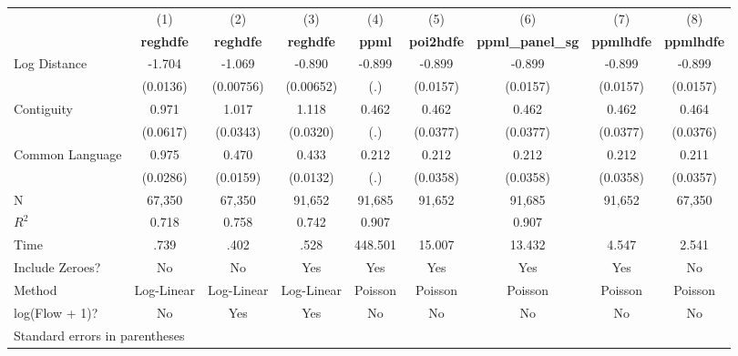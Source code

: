 \begin{tabular}{l*{8}{c}}
\hline\hline
                &\multicolumn{1}{c}{(1)}&\multicolumn{1}{c}{(2)}&\multicolumn{1}{c}{(3)}&\multicolumn{1}{c}{(4)}&\multicolumn{1}{c}{(5)}&\multicolumn{1}{c}{(6)}&\multicolumn{1}{c}{(7)}&\multicolumn{1}{c}{(8)}\\
                &\multicolumn{1}{c}{\textbf{reghdfe}}&\multicolumn{1}{c}{\textbf{reghdfe}}&\multicolumn{1}{c}{\textbf{reghdfe}}&\multicolumn{1}{c}{\textbf{ppml}}&\multicolumn{1}{c}{\textbf{poi2hdfe}}&\multicolumn{1}{c}{\textbf{ppml\_panel\_sg}}&\multicolumn{1}{c}{\textbf{ppmlhdfe}}&\multicolumn{1}{c}{\textbf{ppmlhdfe}}\\
\hline
Log Distance    &   -1.704&   -1.069&   -0.890&   -0.899&   -0.899&   -0.899&   -0.899&   -0.899\\
                & (0.0136)&(0.00756)&(0.00652)&      (.)& (0.0157)& (0.0157)& (0.0157)& (0.0157)\\
[1em]
Contiguity      &    0.971&    1.017&    1.118&    0.462&    0.462&    0.462&    0.462&    0.464\\
                & (0.0617)& (0.0343)& (0.0320)&      (.)& (0.0377)& (0.0377)& (0.0377)& (0.0376)\\
[1em]
Common Language &    0.975&    0.470&    0.433&    0.212&    0.212&    0.212&    0.212&    0.211\\
                & (0.0286)& (0.0159)& (0.0132)&      (.)& (0.0358)& (0.0358)& (0.0358)& (0.0357)\\
\hline
N               &   67,350&   67,350&   91,652&   91,685&   91,652&   91,685&   91,652&   67,350\\
$ R^2$          &    0.718&    0.758&    0.742&    0.907&         &    0.907&         &         \\
Time            &     .739&     .402&     .528&  448.501&   15.007&   13.432&    4.547&    2.541\\
Include Zeroes? &       No&       No&      Yes&      Yes&      Yes&      Yes&      Yes&       No\\
Method          &Log-Linear&Log-Linear&Log-Linear&  Poisson&  Poisson&  Poisson&  Poisson&  Poisson\\
log(Flow + 1)?  &       No&      Yes&      Yes&       No&       No&       No&       No&       No\\
\hline\hline
\multicolumn{9}{l}{\footnotesize Standard errors in parentheses}\\
\end{tabular}
